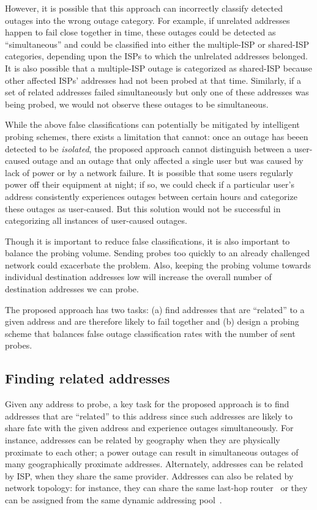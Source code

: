 However, it is possible that this approach can incorrectly classify detected
outages into the wrong outage category. For example, if
unrelated addresses happen to fail close together in time,
these outages could be detected as
``simultaneous'' and could be classified into either the multiple-ISP
or shared-ISP categories, depending upon the ISPs to which
the unlrelated addresses belonged. It is also possible that a
multiple-ISP outage is categorized as shared-ISP because
other affected ISPs' addresses had
not been probed at that time. Similarly, if a set of related addresses failed
simultaneously but only one of these addresses was being
probed, we would not observe these outages to be simultaneous. 

While the above false classifications can potentially be mitigated by
intelligent probing schemes, there exists a limitation that cannot:
once an outage has beeen detected to be \emph{isolated}, the proposed approach cannot distinguish between
a user-caused outage and an outage that only affected a single user
but was caused by lack of power or by a network failure. It is possible
that some users regularly power off their equipment at night; if
so, we could
check if a particular user's address consistently experiences outages
between certain hours and categorize these outages as user-caused. But
this solution would not be successful in categorizing all instances of user-caused outages.

Though it is important to reduce false classifications,
it is also important to balance the probing volume. Sending probes
too quickly to an already challenged network could exacerbate the
problem. Also, keeping the probing volume towards individual
destination addresses low will increase the overall number of
destination addresses we can probe. 

The proposed approach has two tasks:
(a) find addresses that are ``related'' to a given address and are therefore
likely to fail together and
(b) design a probing scheme that balances false outage classification
rates with the number of sent probes.

\subsection{Finding related addresses}

Given any address to probe, a key task for the proposed approach is to
find addresses that are ``related'' to this address since such addresses are likely to share
fate with the given address and experience outages simultaneously. For instance, addresses can be
related by geography when they are physically proximate to each
other; a power outage can result in simultaneous outages
of many geographically proximate addresses. Alternately, addresses can be related by ISP, when they
share the same provider. Addresses can also be related by network
topology: for instance, they can share the same last-hop
router~\cite{hobbit-use-hobbit-imc-instead} or they can be assigned
from the same dynamic addressing
pool~\cite{addrchange-reasons}. 


